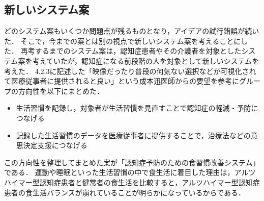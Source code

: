 \documentclass[../report]{subfiles}
\begin{document}
\subsection{新しいシステム案}
どのシステム案もいくつか問題点が残るものとなり，アイデアの試行錯誤が続いた．
そこで，今までの案とは別の視点で新しいシステム案を考えることにした．
再考するまでのシステム案は，認知症患者やその介護者を対象としたシステム案を考えていたが，認知症になる前段階の人を対象として新しいシステムを考えた．
4.2.3に記述した「映像だったり普段の何気ない選択などが可視化されて医療従事者に提供されると良い」という成本迅医師からの要望を参考にグループの方向性を以下にまとめた．

\begin{itemize}
    \item 生活習慣を記録し，対象者が生活習慣を見直すことで認知症の軽減・予防につなげる
    \item 記録した生活習慣のデータを医療従事者に提供することで，治療法などの意思決定支援につなげる
\end{itemize}

この方向性を整理してまとめた案が「認知症予防のための食習慣改善システム」である．
運動や睡眠といった生活習慣の中で食生活に着目した理由は，アルツハイマー型認知症患者と健常者の食生活を比較すると，アルツハイマー型認知症患者の食生活バランスが崩れている\cite{dementia-nutrition}ことが明らかになっているからである．
\end{document}
